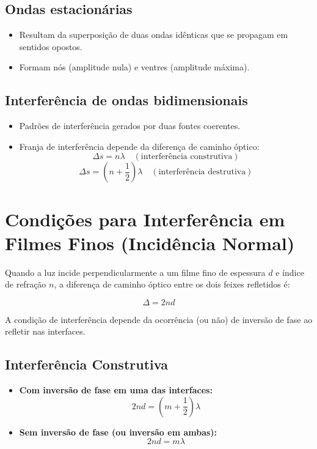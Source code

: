 \documentclass[a4paper,12pt]{article}
\begin{document}
\begin{multicols}{2}
\subsection{Ondas estacionárias}
\begin{itemize}
    \item Resultam da superposição de duas ondas idênticas que se propagam em sentidos opostos.
    \item Formam nós (amplitude nula) e ventres (amplitude máxima).
\end{itemize}

\subsection{Interferência de ondas bidimensionais}
\begin{itemize}
    \item Padrões de interferência gerados por duas fontes coerentes.
    \item Franja de interferência depende da diferença de caminho óptico:
    \[
        \Delta s = n\lambda \quad (\text{interferência construtiva})
    \]
    \[
        \Delta s = \left(n + \frac{1}{2}\right)\lambda \quad (\text{interferência destrutiva})
    \]
\end{itemize}

\section{Condições para Interferência em Filmes Finos (Incidência Normal)}

Quando a luz incide perpendicularmente a um filme fino de espessura \( d \) e índice de refração \( n \), a diferença 
de caminho óptico entre os dois feixes refletidos é:

\[
\Delta = 2nd
\]

A condição de interferência depende da ocorrência (ou não) de inversão de fase ao refletir nas interfaces. 

\subsection*{Interferência Construtiva}

\begin{itemize}
  \item \textbf{Com inversão de fase em uma das interfaces:}
  \[
  2nd = \left( m + \frac{1}{2} \right) \lambda
  \]
  
  \item \textbf{Sem inversão de fase (ou inversão em ambas):}
  \[
  2nd = m \lambda
  \]
\end{itemize}


\end{multicols}
\end{document}
